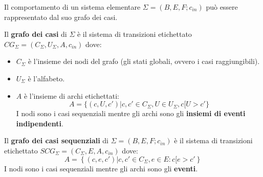 Il comportamento di un sistema elementare $\Sigma = (B, E, F; c_{in})$ può essere
rappresentato dal suo grafo dei casi.
\begin{definizione}
    Il \textbf{grafo dei casi} di $\Sigma$ è il sistema di transizioni etichettato
    $CG_{\Sigma} = (C_{\Sigma},U_{\Sigma}, A, c_{in})$ dove:
    \begin{itemize}
        \item $C_{\Sigma}$ è l'insieme dei nodi del grafo (gli stati globali,
              ovvero i casi raggiungibili).
        \item $U_{\Sigma}$ è l'alfabeto.
        \item $A$ è l'insieme di archi etichettati:
              \begin{equation}
                  A = \{(c, U, c') | c, c' \in C_{\Sigma}, U \in U_{\Sigma}, c[U > c'\}
              \end{equation}
              I nodi sono i casi sequenziali mentre gli archi sono gli
              \textbf{insiemi di eventi indipendenti}.
    \end{itemize}
\end{definizione}
\begin{definizione}
    Il \textbf{grafo dei casi sequenziali} di $\Sigma=(B,E,F;c_{in})$ è
    il sistema di transizioni etichettato $SCG_\Sigma=(C_\Sigma, E, A,c_{in})$
    dove:
    \begin{equation}
        A=\left\{(c,e,c')|c,c'\in C_\Sigma, e\in E: c[e>c' \right\}
    \end{equation}
    I nodi sono i casi sequenziali mentre gli archi sono gli \textbf{eventi}.
\end{definizione}
